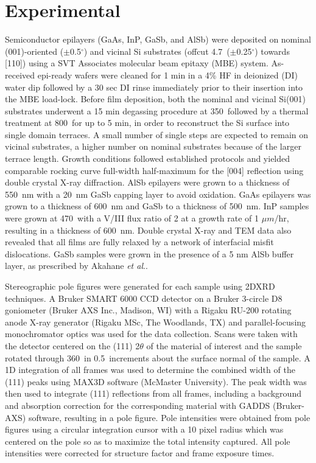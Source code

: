 \section{Experimental}
Semiconductor epilayers (GaAs, InP, GaSb, and AlSb) were deposited on nominal (001)-oriented ($\pm$0.5$^\circ$) and vicinal Si substrates (offcut 4.7\degree~($\pm$0.25$^\circ$) towards [110]) using a SVT Associates molecular beam epitaxy (MBE) system. As-received epi-ready wafers were cleaned for 1 min in a 4\% HF in deionized (DI) water dip followed by a 30 sec DI rinse immediately prior to their insertion into the MBE load-lock. Before film deposition, both the nominal and vicinal Si(001) substrates underwent a 15 min degassing procedure at 350\degree\celsius~followed by a thermal treatment at 800\degree\celsius~for up to 5 min, in order to reconstruct the Si surface into single domain terraces\cite{NeergaardWaltenburg1995,S1991,Sakamoto1986,Pehlke1991}. A small number of single steps are expected to remain on vicinal substrates, a higher number on nominal substrates because of the larger terrace length. Growth conditions followed established protocols\cite{Akahane2004,Balakrishnan2006a,Fischer1986} and yielded comparable rocking curve full-width half-maximum for the [004] reflection using double crystal X-ray diffraction. AlSb epilayers were grown to a thickness of 550~nm with a 20~nm GaSb capping layer to avoid oxidation. GaAs epilayers was grown to a thickness of 600~nm and GaSb to a thickness of 500~nm. InP samples were grown at 470\degree\celsius~with a V/III flux ratio of 2 at a growth rate of 1 $\mu m$/hr, resulting in a thickness of 600~nm. Double crystal X-ray and TEM data also revealed that all films are fully relaxed by a network of interfacial misfit dislocations\cite{Vajargah2011}. GaSb samples were grown in the presence of a 5 nm AlSb buffer layer, as prescribed by Akahane \textit{et al}.\cite{Akahane2004}.

Stereographic pole figures were generated for each sample using 2DXRD techniques. A Bruker SMART 6000 CCD detector on a Bruker 3-circle D8 goniometer (Bruker AXS Inc., Madison, WI) with a Rigaku RU-200 rotating anode X-ray generator (Rigaku MSc, The Woodlands, TX) and parallel-focusing monochromator optics was used for the data collection. Scans were taken with the detector centered on the (111) 2$\theta$ of the material of interest and the sample rotated through 360\degree~in 0.5\degree~increments about the surface normal of the sample. A 1D integration of all frames was used to determine the combined width of the (111) peaks using MAX3D software (McMaster University)\cite{Britten2007}. The peak width was then used to integrate (111) reflections from all frames, including a background and absorption correction for the corresponding material with GADDS (Bruker-AXS) software, resulting in a pole figure. Pole intensities were obtained from pole figures using a circular integration cursor with a 10 pixel radius which was centered on the pole so as to maximize the total intensity captured. All pole intensities were corrected for structure factor and frame exposure times.

